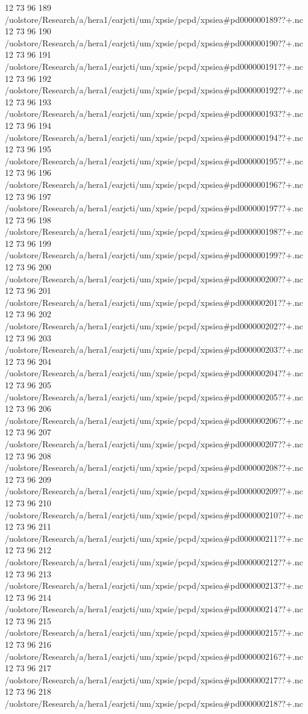 12 73 96
189
/uolstore/Research/a/hera1/earjcti/um/xpsie/pcpd/xpsiea#pd000000189??+.nc
12 73 96
190
/uolstore/Research/a/hera1/earjcti/um/xpsie/pcpd/xpsiea#pd000000190??+.nc
12 73 96
191
/uolstore/Research/a/hera1/earjcti/um/xpsie/pcpd/xpsiea#pd000000191??+.nc
12 73 96
192
/uolstore/Research/a/hera1/earjcti/um/xpsie/pcpd/xpsiea#pd000000192??+.nc
12 73 96
193
/uolstore/Research/a/hera1/earjcti/um/xpsie/pcpd/xpsiea#pd000000193??+.nc
12 73 96
194
/uolstore/Research/a/hera1/earjcti/um/xpsie/pcpd/xpsiea#pd000000194??+.nc
12 73 96
195
/uolstore/Research/a/hera1/earjcti/um/xpsie/pcpd/xpsiea#pd000000195??+.nc
12 73 96
196
/uolstore/Research/a/hera1/earjcti/um/xpsie/pcpd/xpsiea#pd000000196??+.nc
12 73 96
197
/uolstore/Research/a/hera1/earjcti/um/xpsie/pcpd/xpsiea#pd000000197??+.nc
12 73 96
198
/uolstore/Research/a/hera1/earjcti/um/xpsie/pcpd/xpsiea#pd000000198??+.nc
12 73 96
199
/uolstore/Research/a/hera1/earjcti/um/xpsie/pcpd/xpsiea#pd000000199??+.nc
12 73 96
200
/uolstore/Research/a/hera1/earjcti/um/xpsie/pcpd/xpsiea#pd000000200??+.nc
12 73 96
201
/uolstore/Research/a/hera1/earjcti/um/xpsie/pcpd/xpsiea#pd000000201??+.nc
12 73 96
202
/uolstore/Research/a/hera1/earjcti/um/xpsie/pcpd/xpsiea#pd000000202??+.nc
12 73 96
203
/uolstore/Research/a/hera1/earjcti/um/xpsie/pcpd/xpsiea#pd000000203??+.nc
12 73 96
204
/uolstore/Research/a/hera1/earjcti/um/xpsie/pcpd/xpsiea#pd000000204??+.nc
12 73 96
205
/uolstore/Research/a/hera1/earjcti/um/xpsie/pcpd/xpsiea#pd000000205??+.nc
12 73 96
206
/uolstore/Research/a/hera1/earjcti/um/xpsie/pcpd/xpsiea#pd000000206??+.nc
12 73 96
207
/uolstore/Research/a/hera1/earjcti/um/xpsie/pcpd/xpsiea#pd000000207??+.nc
12 73 96
208
/uolstore/Research/a/hera1/earjcti/um/xpsie/pcpd/xpsiea#pd000000208??+.nc
12 73 96
209
/uolstore/Research/a/hera1/earjcti/um/xpsie/pcpd/xpsiea#pd000000209??+.nc
12 73 96
210
/uolstore/Research/a/hera1/earjcti/um/xpsie/pcpd/xpsiea#pd000000210??+.nc
12 73 96
211
/uolstore/Research/a/hera1/earjcti/um/xpsie/pcpd/xpsiea#pd000000211??+.nc
12 73 96
212
/uolstore/Research/a/hera1/earjcti/um/xpsie/pcpd/xpsiea#pd000000212??+.nc
12 73 96
213
/uolstore/Research/a/hera1/earjcti/um/xpsie/pcpd/xpsiea#pd000000213??+.nc
12 73 96
214
/uolstore/Research/a/hera1/earjcti/um/xpsie/pcpd/xpsiea#pd000000214??+.nc
12 73 96
215
/uolstore/Research/a/hera1/earjcti/um/xpsie/pcpd/xpsiea#pd000000215??+.nc
12 73 96
216
/uolstore/Research/a/hera1/earjcti/um/xpsie/pcpd/xpsiea#pd000000216??+.nc
12 73 96
217
/uolstore/Research/a/hera1/earjcti/um/xpsie/pcpd/xpsiea#pd000000217??+.nc
12 73 96
218
/uolstore/Research/a/hera1/earjcti/um/xpsie/pcpd/xpsiea#pd000000218??+.nc
